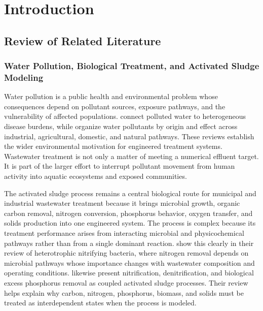 \documentclass[12pt, twoside]{book}
\begin{document}
\renewcommand{\chaptermark}[1]{\markboth{\chaptername\ \thechapter}{}}

\chapter*{Introduction}
\label{ch:intro}

\section{Review of Related Literature}

\subsection{Water Pollution, Biological Treatment, and Activated Sludge Modeling}

Water pollution is a public health and environmental problem whose consequences depend on pollutant sources,
exposure pathways, and the vulnerability of affected populations. \citet{Lin2022} connect polluted water to
heterogeneous disease burdens, while \citet{Madhav2019} organize water pollutants by origin and effect across
industrial, agricultural, domestic, and natural pathways. These reviews establish the wider environmental
motivation for engineered treatment systems. Wastewater treatment is not only a matter of meeting a numerical
effluent target. It is part of the larger effort to interrupt pollutant movement from human activity into
aquatic ecosystems and exposed communities.

The activated sludge process remains a central biological route for municipal and industrial wastewater
treatment because it brings microbial growth, organic carbon removal, nitrogen conversion, phosphorus behavior,
oxygen transfer, and solids production into one engineered system. The process is complex because its treatment
performance arises from interacting microbial and physicochemical pathways rather than from a single dominant
reaction. \citet{Duan2022} show this clearly in their review of heterotrophic nitrifying bacteria, where
nitrogen removal depends on microbial pathways whose importance changes with wastewater composition and
operating conditions. \citet{Wentzel1992} likewise present nitrification, denitrification, and biological
excess phosphorus removal as coupled activated sludge processes. Their review helps explain why carbon,
nitrogen, phosphorus, biomass, and solids must be treated as interdependent states when the process is modeled.
\end{document}
